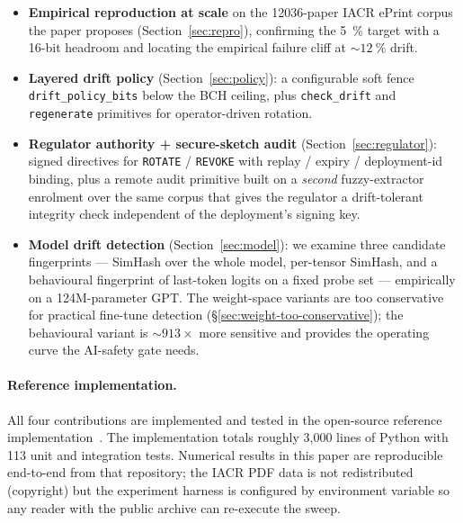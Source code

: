 \documentclass[11pt,a4paper]{article}
\begin{document}
\begin{itemize}
  \item \textbf{Empirical reproduction at scale} on the \num{12036}\nobreakdash-paper
        IACR ePrint corpus the paper proposes
        (Section~\ref{sec:repro}), confirming the \SI{5}{\percent}
        target with a 16\nobreakdash-bit headroom and locating the
        empirical failure cliff at $\sim\!\SI{12}{\percent}$ drift.
  \item \textbf{Layered drift policy} (Section~\ref{sec:policy}): a
        configurable soft fence \texttt{drift\_policy\_bits} below
        the BCH ceiling, plus \texttt{check\_drift} and
        \texttt{regenerate} primitives for operator\nobreakdash-driven
        rotation.
  \item \textbf{Regulator authority + secure\nobreakdash-sketch audit}
        (Section~\ref{sec:regulator}): signed directives for
        \texttt{ROTATE} / \texttt{REVOKE} with replay /
        expiry / deployment\nobreakdash-id binding, plus a remote audit
        primitive built on a \emph{second} fuzzy\nobreakdash-extractor
        enrolment over the same corpus that gives the regulator a
        drift\nobreakdash-tolerant integrity check independent of the
        deployment's signing key.
  \item \textbf{Model drift detection} (Section~\ref{sec:model}):
        we examine three candidate fingerprints — SimHash over the
        whole model, per\nobreakdash-tensor SimHash, and a behavioural
        fingerprint of last\nobreakdash-token logits on a fixed probe
        set — empirically on a 124M\nobreakdash-parameter GPT.
        The weight\nobreakdash-space variants are too conservative
        for practical fine\nobreakdash-tune detection
        (§\ref{sec:weight-too-conservative}); the behavioural
        variant is ${\sim}\!9$\textendash$13\!\times$ more sensitive
        and provides the operating curve the AI\nobreakdash-safety
        gate needs.
\end{itemize}

\paragraph{Reference implementation.}  All four contributions are
implemented and tested in the open\nobreakdash-source reference
implementation~\cite{ragsign-impl}.  The implementation totals
roughly 3{,}000 lines of Python with 113 unit and integration tests.
Numerical results in this paper are reproducible end\nobreakdash-to\nobreakdash-end
from that repository; the IACR PDF data is not redistributed
(copyright) but the experiment harness is configured by environment
variable so any reader with the public archive can re\nobreakdash-execute
the sweep.
\end{document}
